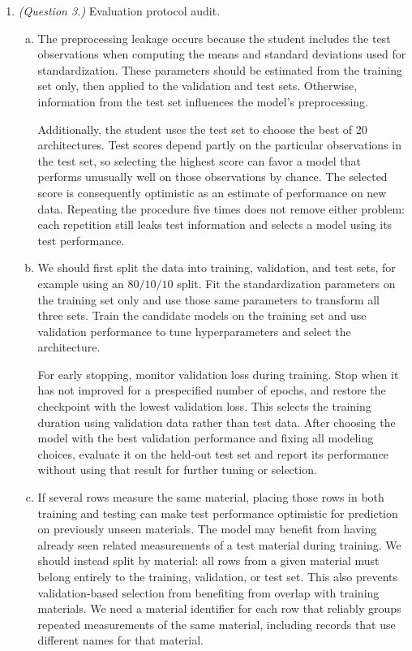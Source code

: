 \documentclass[12pt]{article}
\begin{document}
\begin{enumerate}
   \item \emph{(Question 3.)} Evaluation protocol audit.
   \begin{enumerate}[(a)]
       \item The preprocessing leakage occurs because the student
       includes the test observations when computing the means and
       standard deviations used for standardization. These parameters
       should be estimated from the training set only, then applied
       to the validation and test sets. Otherwise, information from
       the test set influences the model's preprocessing.

       Additionally, the student uses the test set to choose the best
       of 20 architectures. Test scores depend partly on the particular
       observations in the test set, so selecting the highest score
       can favor a model that performs unusually well on those
       observations by chance. The selected score is consequently
       optimistic as an estimate of performance on new data.
       Repeating the procedure five times does not remove either
       problem: each repetition still leaks test information and
       selects a model using its test performance.

       \item We should first split the data into training, validation,
       and test sets, for example using an $80/10/10$ split. Fit the
       standardization parameters on the training set only and use
       those same parameters to transform all three sets. Train the
       candidate models on the training set and use validation
       performance to tune hyperparameters and select the architecture.

       For early stopping, monitor validation loss during training.
       Stop when it has not improved for a prespecified number of
       epochs, and restore the checkpoint with the
       lowest validation loss. This selects the training duration
       using validation data rather than test data. After choosing
       the model with the best validation performance and fixing all
       modeling choices, evaluate it on the held-out test set and
       report its performance without using that result for further
       tuning or selection.

       \item If several rows measure the same material, placing those
       rows in both training and testing can make test performance
       optimistic for prediction on previously unseen materials.
       The model may benefit from having already seen related
       measurements of a test material during training.
       We should instead split by material: all rows from a given
       material must belong entirely to the training, validation,
       or test set. This also prevents validation-based selection
       from benefiting from overlap with training materials.
       We need a material identifier for each row that reliably
       groups repeated measurements of the same material, including
       records that use different names for that material.
   \end{enumerate}


\end{enumerate}
\end{document}
